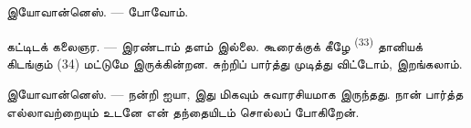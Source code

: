 \textsc{இயோவான்னெஸ்}. ---  போவோம்.

\textsc{கட்டிடக் கலைஞர}. --- இரண்டாம் தளம் இல்லை. கூரைக்குக் கீழே
 \textsuperscript{(33)} தானியக் கிடங்கும் (34)
மட்டுமே இருக்கின்றன. சுற்றிப் பார்த்து முடித்து விட்டோம், இறங்கலாம்.

\textsc{இயோவான்னெஸ்}. --- நன்றி ஐயா, இது மிகவும் சுவாரசியமாக இருந்தது.
நான் பார்த்த எல்லாவற்றையும் உடனே என் தந்தையிடம் சொல்லப் போகிறேன்.

\VUsaut{4.0mm}
\VUfilet{22mm}

